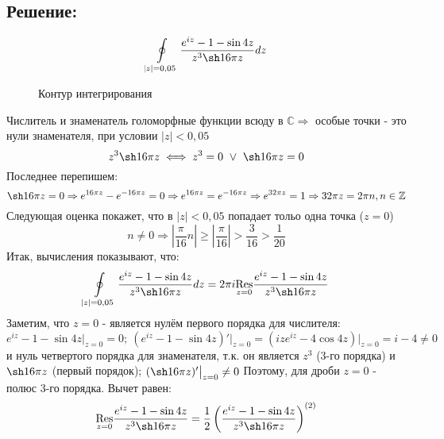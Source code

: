 \documentclass{article}
\begin{document}
	\subsection{Решение:}
	\[\oint\limits_{|z|=0,05} \frac{e^{iz} - 1 -\sin 4z}{z^3 \sh 16 \pi z}dz\]
	\begin{figure}[h]
		\centering
		\caption{Контур интегрирования}
		
	\end{figure}
	\newline
	Числитель и знаменатель голоморфные функции всюду в $\mathbb{C} \Rightarrow$ особые точки - это нули знаменателя, при условии $|z| < 0,05$
	\[z^3\sh16\pi z \iff z^3 = 0 \ \lor \ \sh 16 \pi z = 0 \]
	Последнее перепишем:
	\[\sh 16 \pi z = 0 \Rightarrow e^{16\pi z} - e^{-16\pi z} = 0 \Rightarrow e^{16\pi z} = e^{-16\pi z} \Rightarrow e^{32\pi z} = 1 \Rightarrow 32\pi z = 2\pi n, n \in \mathbb{Z}\]
	Следующая оценка покажет, что в $|z| < 0,05$ попадает тольо одна точка ($z=0$)
	\[n \ne 0 \Rightarrow \left|\frac{\pi}{16}n\right| \ge \left|\frac{\pi}{16}\right| > \frac{3}{16} > \frac{1}{20}\]
	Итак, вычисления показывают, что:
	\[\oint\limits_{|z|=0,05} \frac{e^{iz} - 1 -\sin 4z}{z^3 \sh 16 \pi z}dz = 2\pi i \underset{z=0}{\text{Res}}\frac{e^{iz} - 1 -\sin 4z}{z^3 \sh 16 \pi z}\]
	Заметим, что $z=0$ - является нулём первого порядка для числителя:
	\[e^{iz}-1-\sin4z \big|_{z=0} = 0; \ (e^{iz} -1 -\sin 4z)'\big|_{z=0} = (ize^{iz} -4\cos 4z)\big|_{z=0} = i -4 \ne 0\]
	и нуль четвертого порядка для знаменателя, т.к. он является $z^3$ (3-го порядка) и $\sh16\pi z$ (первый порядок); $(\sh16\pi z)'\big|_{z=0} \ne 0$\newline
	Поэтому, для дроби $z=0$ - полюс 3-го порядка. \newline Вычет равен:
	\[\underset{z=0}{\text{Res}}\frac{e^{iz} - 1 -\sin 4z}{z^3 \sh 16 \pi z} = \frac{1}{2}\left(\frac{e^{iz} - 1 -\sin 4z}{z^3 \sh 16 \pi z}\right)^{(2)}\]
\end{document}
